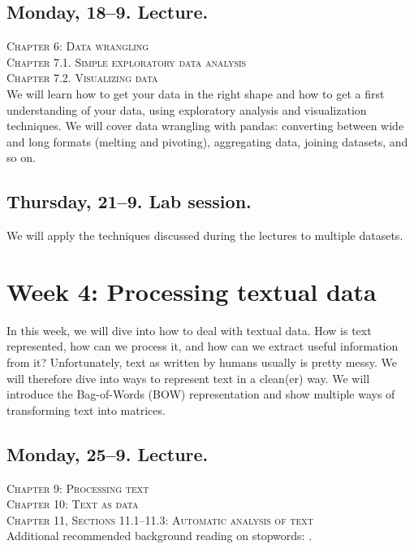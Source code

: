 \subsection*{Monday, 18--9. Lecture.}
\textsc{ Chapter 6: Data wrangling}\\
\textsc{ Chapter 7.1. Simple exploratory data analysis}\\
\textsc{ Chapter 7.2. Visualizing data}\\

We will learn how to get your data in the right shape and how to get a first understanding of your data, using exploratory analysis and visualization techniques. We will cover data wrangling with pandas: converting between wide and long formats (melting and pivoting), aggregating data, joining datasets, and so on.

\subsection*{Thursday, 21--9. Lab session.}
We will apply the techniques discussed during the lectures to multiple datasets.


\section*{Week 4: Processing textual data}
In this week, we will dive into how to deal with textual data. How is text represented, how can we process it, and how can we extract useful information from it?
Unfortunately, text as written by humans usually is pretty messy.  We will therefore dive  into ways to represent text in a clean(er) way. We will introduce the Bag-of-Words (BOW) representation and show multiple ways of transforming text into matrices.

\subsection*{Monday, 25--9. Lecture.}
\textsc{ Chapter 9: Processing text}\\
\textsc{ Chapter 10: Text as data}\\
\textsc{ Chapter 11, Sections 11.1--11.3: Automatic analysis of text}\\

Additional recommended background reading on stopwords: \cite{Nothman2018}.
  

